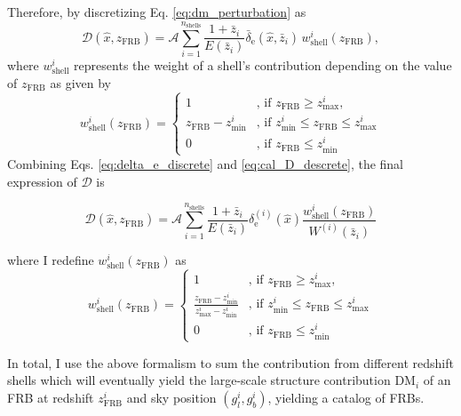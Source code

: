 Therefore, by discretizing Eq. \ref{eq:dm_perturbation} as
\begin{equation}
\mathcal{D}(\hat{x}, z_\mathrm{FRB}) = \mathcal{A} \displaystyle\sum_{i = 1}^{n_\mathrm{shells}} \frac{1 + \bar{z}_i}{E(\bar{z}_i)} \bar{\delta}_\mathrm{e} (\hat{x}, \bar{z}_i) \, w_\mathrm{shell}^i(z_\mathrm{FRB}),
\end{equation}
where $w_\mathrm{shell}^i$ represents the weight of a shell's contribution depending on the value of $z_\mathrm{FRB}$ as given by
\begin{equation}\label{eq:cal_D_descrete}
    w_\mathrm{shell}^i(z_\mathrm{FRB}) = \begin{cases} 1 & \text{, if } z_\mathrm{FRB} \geq z_\mathrm{max}^i , \\ z_\mathrm{FRB} - z_\mathrm{min}^i & \text{, if } z_\mathrm{min}^i \leq z_\mathrm{FRB} \leq z_\mathrm{max}^i\\ 0 & \text{, if } z_\mathrm{FRB} \leq z_\mathrm{min}^i \end{cases}
\end{equation}
Combining Eqs. \ref{eq:delta_e_discrete} and \ref{eq:cal_D_descrete}, the final expression of $\mathcal{D}$ is

\begin{equation}
    \mathcal{D}(\hat{x}, z_\mathrm{FRB}) =\mathcal{A} \sum_{i = 1}^{n_\mathrm{shells}} \frac{1 + \bar{z}_i}{E(\bar{z}_i)} \delta_{\mathrm{e}}^{(i)}(\hat{x}) \frac{w_\mathrm{shell}^i(z_\mathrm{FRB})}{W^{(i)}(\bar{z}_i)}
\end{equation}

where I redefine $w_\mathrm{shell}^i(z_\mathrm{FRB})$ as
\begin{equation}\label{eq:cal_D_descrete_final}
    w_\mathrm{shell}^i(z_\mathrm{FRB}) = \begin{cases} 1 & \text{, if } z_\mathrm{FRB} \geq z_\mathrm{max}^i , \\ \frac{z_\mathrm{FRB} - z_\mathrm{min}^i}{z_\mathrm{max}^i - z_\mathrm{min}^i} & \text{, if } z_\mathrm{min}^i \leq z_\mathrm{FRB} \leq z_\mathrm{max}^i\\ 0 & \text{, if } z_\mathrm{FRB} \leq z_\mathrm{min}^i \end{cases}
\end{equation}

In total, I use the above formalism to sum the contribution from different redshift shells which will eventually yield the large-scale structure contribution $\mathrm{DM}_i$ of an FRB at redshift $z_\mathrm{FRB}^{i}$ and sky position $(g_l^i, g_b^i)$, yielding a catalog of FRBs.


